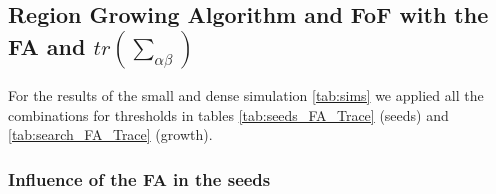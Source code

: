 \documentclass[12pt]{article}
\begin{document}
\subsection{Region Growing Algorithm and FoF with the FA and $tr \left(\sum_{\alpha\beta}\right)$}

\begin{par}
For the results of the small and dense simulation \ref{tab:sims} we applied all the combinations for thresholds in tables \ref{tab:seeds_FA_Trace} (seeds)  and \ref{tab:search_FA_Trace} (growth). 
\end{par}

\subsubsection{Influence of the FA in the seeds}
\end{document}
